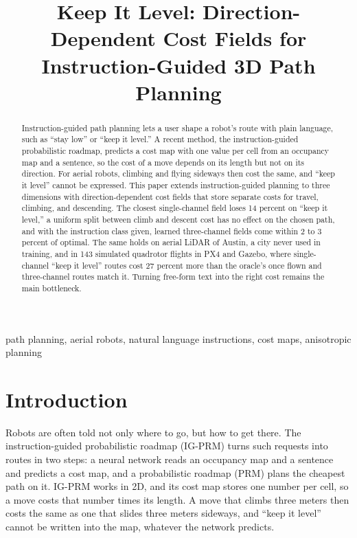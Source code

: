 \documentclass[conference]{IEEEtran}
\begin{document}
\title{Keep It Level: Direction-Dependent Cost Fields for Instruction-Guided 3D Path Planning}

\author{
}

\maketitle
\thispagestyle{empty}

\begin{abstract}
Instruction-guided path planning lets a user shape a robot's route with plain language, such as ``stay low'' or ``keep it level.'' A recent method, the instruction-guided probabilistic roadmap, predicts a cost map with one value per cell from an occupancy map and a sentence, so the cost of a move depends on its length but not on its direction. For aerial robots, climbing and flying sideways then cost the same, and ``keep it level'' cannot be expressed. This paper extends instruction-guided planning to three dimensions with direction-dependent cost fields that store separate costs for travel, climbing, and descending. The closest single-channel field loses 14 percent on ``keep it level,'' a uniform split between climb and descent cost has no effect on the chosen path, and with the instruction class given, learned three-channel fields come within 2 to 3 percent of optimal. The same holds on aerial LiDAR of Austin, a city never used in training, and in 143 simulated quadrotor flights in PX4 and Gazebo, where single-channel ``keep it level'' routes cost 27 percent more than the oracle's once flown and three-channel routes match it. Turning free-form text into the right cost remains the main bottleneck.
\end{abstract}

\begin{IEEEkeywords}
path planning, aerial robots, natural language instructions, cost maps, anisotropic planning
\end{IEEEkeywords}

\section{Introduction}

Robots are often told not only where to go, but how to get there. The instruction-guided probabilistic roadmap (IG-PRM) \cite{bao2025igprm} turns such requests into routes in two steps: a neural network reads an occupancy map and a sentence and predicts a cost map, and a probabilistic roadmap (PRM) \cite{kavraki1996prm} plans the cheapest path on it. IG-PRM works in 2D, and its cost map stores one number per cell, so a move costs that number times its length. A move that climbs three meters then costs the same as one that slides three meters sideways, and ``keep it level'' cannot be written into the map, whatever the network predicts.
\end{document}

